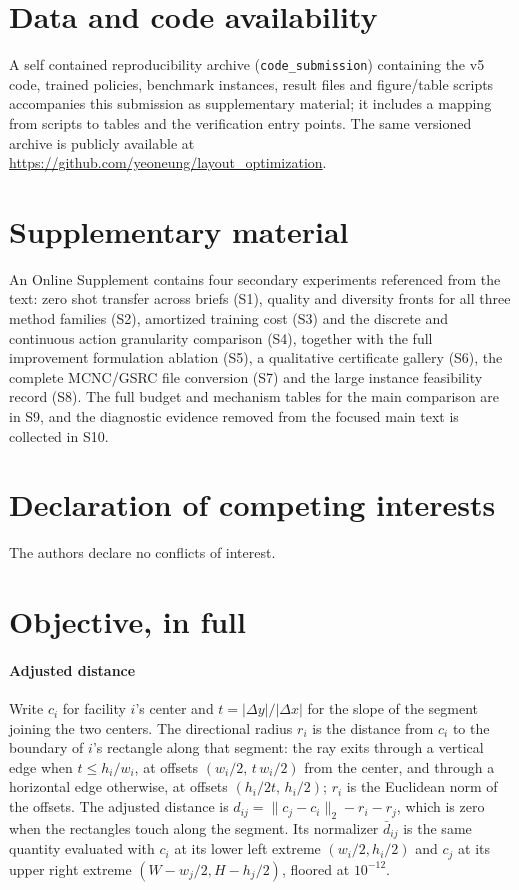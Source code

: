 \documentclass[preprint,12pt,authoryear]{elsarticle}
\newcommand{\code}[1]{\texttt{#1}}
\begin{document}
\section*{Data and code availability}
A self contained reproducibility archive (\code{code\_submission}) containing
the v5 code, trained policies, benchmark instances, result files and
figure/table scripts accompanies this submission as supplementary material; it
includes a mapping from scripts to tables and the verification entry points. The
same versioned archive is publicly available at
\url{https://github.com/yeoneung/layout_optimization}.

\section*{Supplementary material}
An Online Supplement contains four secondary experiments referenced from the
text: zero shot transfer across briefs (S1), quality and diversity fronts for all
three method families (S2), amortized training cost (S3) and the
discrete and continuous action granularity comparison (S4), together with
the full improvement formulation ablation (S5), a qualitative certificate
gallery (S6), the complete MCNC/GSRC file conversion (S7) and the
large instance feasibility record (S8). The full budget and mechanism tables for
the main comparison are in S9, and the diagnostic evidence removed from the
focused main text is collected in S10.

\section*{Declaration of competing interests}
The authors declare no conflicts of interest.

\appendix
\section{Objective, in full}
\label{app:objective}
\paragraph{Adjusted distance}
Write $c_i$ for facility $i$'s center and $t=|\Delta y|/|\Delta x|$ for the
slope of the segment joining the two centers. The directional radius $r_i$ is
the distance from $c_i$ to the boundary of $i$'s rectangle along that segment:
the ray exits through a vertical edge when $t\le h_i/w_i$, at offsets
$(w_i/2,\,t\,w_i/2)$ from the center, and through a horizontal edge otherwise,
at offsets $(h_i/2t,\,h_i/2)$; $r_i$ is the Euclidean norm of the offsets. The
adjusted distance is $d_{ij}=\lVert c_j-c_i\rVert_2-r_i-r_j$, which is zero
when the rectangles touch along the segment. Its normalizer $\bar d_{ij}$ is
the same quantity evaluated with $c_i$ at its lower left extreme
$(w_i/2,h_i/2)$ and $c_j$ at its upper right extreme $(W-w_j/2,H-h_j/2)$,
floored at $10^{-12}$.
\end{document}
